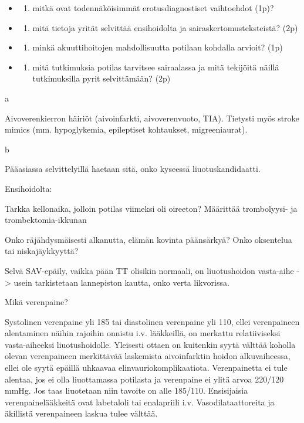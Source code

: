 \documentclass[
]{book}
\providecommand{\tightlist}{%
  \setlength{\itemsep}{0pt}\setlength{\parskip}{0pt}}
\begin{document}
\begin{itemize}
\tightlist
\item
  \begin{enumerate}
  \def\labelenumi{\alph{enumi}.}
  \tightlist
  \item
    mitkä ovat todennäköisimmät erotusdiagnostiset vaihtoehdot (1p)?
  \end{enumerate}
\item
  \begin{enumerate}
  \def\labelenumi{\alph{enumi}.}
  \setcounter{enumi}{1}
  \tightlist
  \item
    mitä tietoja yrität selvittää ensihoidolta ja sairaskertomusteksteistä? (2p)
  \end{enumerate}
\item
  \begin{enumerate}
  \def\labelenumi{\alph{enumi}.}
  \setcounter{enumi}{2}
  \tightlist
  \item
    minkä akuuttihoitojen mahdollisuutta potilaan kohdalla arvioit? (1p)
  \end{enumerate}
\item
  \begin{enumerate}
  \def\labelenumi{\alph{enumi}.}
  \setcounter{enumi}{3}
  \tightlist
  \item
    mitä tutkimuksia potilas tarvitsee sairaalassa ja mitä tekijöitä näillä tutkimuksilla pyrit selvittämään? (2p)
  \end{enumerate}
\end{itemize}

a

Aivoverenkierron häiriöt (aivoinfarkti, aivoverenvuoto, TIA). Tietysti myös stroke mimics (mm. hypoglykemia, epileptiset kohtaukset, migreeniaurat).

b

Pääasiassa selvittelyillä haetaan sitä, onko kyseessä liuotuskandidaatti.

Ensihoidolta:

Tarkka kellonaika, jolloin potilas viimeksi oli oireeton? Määrittää trombolyysi- ja trombektomia-ikkunan

Onko räjähdysmäisesti alkanutta, elämän kovinta päänsärkyä? Onko oksentelua tai niskajäykkyyttä?

Selvä SAV-epäily, vaikka pään TT olisikin normaali, on liuotushoidon vasta-aihe -\textgreater{} usein tarkistetaan lannepiston kautta, onko verta likvorissa.

Mikä verenpaine?

Systolinen verenpaine yli 185 tai diastolinen verenpaine yli 110, ellei verenpaineen alentaminen näihin rajoihin onnistu i.v. lääkkeillä, on merkattu relatiiviseksi vasta-aiheeksi liuotushoidolle. Yleisesti ottaen on kuitenkin syytä välttää koholla olevan verenpaineen merkittävää laskemista aivoinfarktin hoidon alkuvaiheessa, ellei ole syytä epäillä uhkaavaa elinvauriokomplikaatiota. Verenpainetta ei tule alentaa, jos ei olla liuottamassa potilasta ja verenpaine ei ylitä arvoa 220/120 mmHg. Jos taas liuotetaan niin tavoite on alle 185/110. Ensisijaisia verenpainelääkkeitä ovat labetaloli tai enalapriili i.v. Vasodilataattoreita ja äkillistä verenpaineen laskua tulee välttää.
\end{document}

